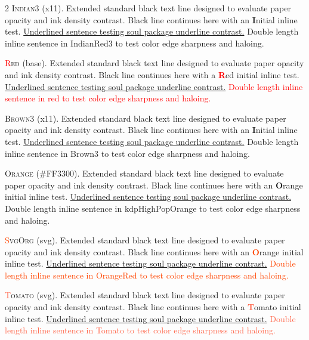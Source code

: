 \begin{multicols}{2}
\lettrine[lines=2]{\textcolor{IndianRed3}{I}}{ndian3} (x11). Extended standard black text line designed to evaluate paper opacity and ink density contrast. Black line continues here with an \textbf{\textcolor{IndianRed3}{I}}nitial inline test. \ul{Underlined sentence testing soul package underline contrast.} \textcolor{IndianRed3}{Double length inline sentence in IndianRed3 to test color edge sharpness and haloing.}


\lettrine[lines=2]{\textcolor{red}{R}}{ed} (base). Extended standard black text line designed to evaluate paper opacity and ink density contrast. Black line continues here with a \textbf{\textcolor{red}{R}}ed initial inline test. \ul{Underlined sentence testing soul package underline contrast.} \textcolor{red}{Double length inline sentence in red to test color edge sharpness and haloing.}


\lettrine[lines=2]{\textcolor{Brown3}{B}}{rown3} (x11). Extended standard black text line designed to evaluate paper opacity and ink density contrast. Black line continues here with an \textbf{\textcolor{Brown3}{I}}nitial inline test. \ul{Underlined sentence testing soul package underline contrast.} \textcolor{Brown3}{Double length inline sentence in Brown3 to test color edge sharpness and haloing.}


\lettrine[lines=2]{\textcolor{kdpHighPopOrange}{O}}{range} (\#FF3300). Extended standard black text line designed to evaluate paper opacity and ink density contrast. Black line continues here with an \textbf{\textcolor{kdpHighPopOrange}{O}}range initial inline test. \ul{Underlined sentence testing soul package underline contrast.} \textcolor{kdpHighPopOrange}{Double length inline sentence in kdpHighPopOrange to test color edge sharpness and haloing.}


\lettrine[lines=2]{\textcolor{OrangeRed}{S}}{vgOrg} (svg). Extended standard black text line designed to evaluate paper opacity and ink density contrast. Black line continues here with an \textbf{\textcolor{OrangeRed}{O}}range initial inline test. \ul{Underlined sentence testing soul package underline contrast.} \textcolor{OrangeRed}{Double length inline sentence in OrangeRed to test color edge sharpness and haloing.}


\lettrine[lines=2]{\textcolor{Tomato}{T}}{omato} (svg). Extended standard black text line designed to evaluate paper opacity and ink density contrast. Black line continues here with a \textbf{\textcolor{Tomato}{T}}omato initial inline test. \ul{Underlined sentence testing soul package underline contrast.} \textcolor{Tomato}{Double length inline sentence in Tomato to test color edge sharpness and haloing.}



\end{multicols}
